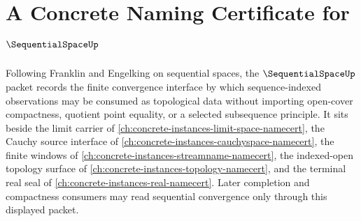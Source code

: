 \chapter{A Concrete Naming Certificate for $\SequentialSpaceUp$}
\label{ch:concrete-instances-sequential-space-namecert}

Following Franklin and Engelking on sequential spaces, the $\SequentialSpaceUp$ packet records the finite convergence interface by which sequence-indexed observations may be consumed as topological data without importing open-cover compactness, quotient point equality, or a selected subsequence principle. It sits beside the limit carrier of \autoref{ch:concrete-instances-limit-space-namecert}, the Cauchy source interface of \autoref{ch:concrete-instances-cauchyspace-namecert}, the finite windows of \autoref{ch:concrete-instances-streamname-namecert}, the indexed-open topology surface of \autoref{ch:concrete-instances-topology-namecert}, and the terminal real seal of \autoref{ch:concrete-instances-real-namecert}. Later completion and compactness consumers may read sequential convergence only through this displayed packet.

